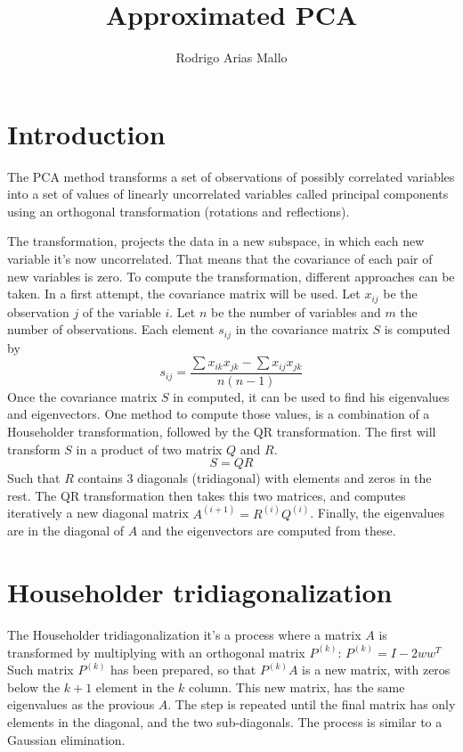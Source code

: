 \documentclass[11pt,a4paper]{article}
\title{Approximated PCA}
\author{Rodrigo Arias Mallo}
\begin{document}
\maketitle

\section{Introduction}

The PCA method transforms a set of observations of possibly correlated variables 
into a set of values of linearly uncorrelated variables called principal 
components using an orthogonal transformation (rotations and reflections).

The transformation, projects the data in a new subspace, in which each new 
variable it's now uncorrelated. That means that the covariance of each pair of 
new variables is zero.
%
To compute the transformation, different approaches can be taken. In a first 
attempt, the covariance matrix will be used.
%
Let $x_{ij}$ be the observation $j$ of the variable $i$. Let $n$ be the number 
of variables and $m$ the number of observations.
%
Each element $s_{ij}$ in the covariance matrix $S$ is computed by
%
$$ s_{ij} = \frac{\sum x_{ik} x_{jk} - \sum x_{ij} x_{jk}}{n (n-1)} $$
%
Once the covariance matrix $S$ in computed, it can be used to find his 
eigenvalues and eigenvectors. One method to compute those values, is a 
combination of a Householder transformation, followed by the QR transformation.  
The first will transform $S$ in a product of two matrix $Q$ and $R$.
%
	$$ S = QR $$
%
Such that $R$ contains 3 diagonals (tridiagonal) with elements and zeros in the 
rest. The QR transformation then takes this two matrices, and computes 
iteratively a new diagonal matrix $A^{(i+1)} = R^{(i)} Q^{(i)}$. Finally, the 
eigenvalues are in the diagonal of $A$ and the eigenvectors are computed from 
these.

\section{Householder tridiagonalization}

The Householder tridiagonalization it's a process where a matrix $A$ is 
transformed by multiplying with an orthogonal matrix $P^{(k)}$:
%
$P^{(k)} = I - 2ww^T$
%
Such matrix $P^{(k)}$ has been prepared, so that $P^{(k)}A$ is a new matrix, 
with zeros below the $k+1$ element in the $k$ column. This new matrix, has the 
same eigenvalues as the provious $A$. The step is repeated until the final 
matrix has only elements in the diagonal, and the two sub-diagonals. The process 
is similar to a Gaussian elimination.
\end{document}
